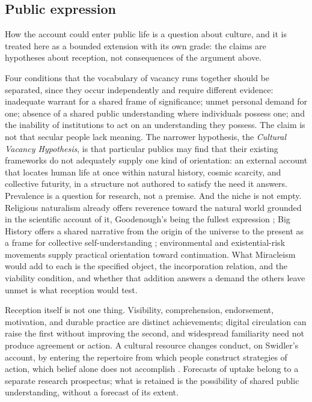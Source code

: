 \subsection*{Public expression}

How the account could enter public life is a question about culture, and it is
treated here as a bounded extension with its own grade: the claims are
hypotheses about reception, not consequences of the argument above.

Four conditions that the vocabulary of vacancy runs together should be
separated, since they occur independently and require different evidence:
inadequate warrant for a shared frame of significance; unmet personal demand
for one; absence of a shared public understanding where individuals possess
one; and the inability of institutions to act on an understanding they
possess. The claim is not that secular people lack meaning. The narrower
hypothesis, the \emph{Cultural Vacancy Hypothesis}, is that particular
publics may find that their existing frameworks do not
adequately supply one kind of orientation: an external account that locates
human life at once within natural history, cosmic scarcity, and collective
futurity, in a structure not authored to satisfy the need it answers.
Prevalence is a question for research, not a premise. And the niche is not
empty. Religious naturalism already offers reverence toward the natural world
grounded in the scientific account of it, Goodenough's being the fullest
expression \cite{Goodenough98}; Big History offers a shared narrative from the
origin of the universe to the present as a frame for collective
self-understanding \cite{Christian04}; environmental and existential-risk
movements supply practical orientation toward continuation. What Miracleism
would add to each is the specified object, the incorporation relation, and
the viability condition, and whether that addition answers a demand the
others leave unmet is what reception would test.

Reception itself is not one thing. Visibility, comprehension, endorsement,
motivation, and durable practice are distinct achievements; digital
circulation can raise the first without improving the second, and widespread
familiarity need not produce agreement or action. A cultural resource changes
conduct, on Swidler's account, by entering the repertoire from which people
construct strategies of action, which belief alone does not accomplish
\cite{Swidler86}. Forecasts of uptake belong to a separate research
prospectus; what is retained is the possibility of shared public
understanding, without a forecast of its extent.

